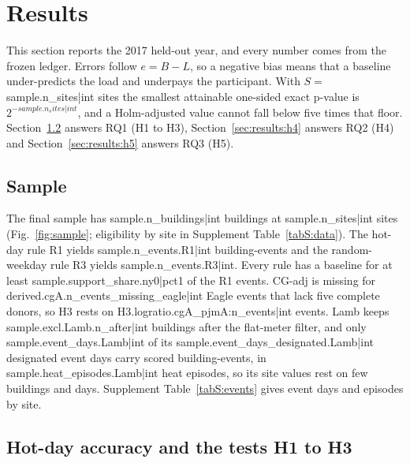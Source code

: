 \section{Results}\label{sec:results}

This section reports the 2017 held-out year, and every number comes from the frozen ledger. Errors follow $e=B-L$, so a negative bias means that a baseline under-predicts the load and underpays the participant. With $S=\,${{sample.n_sites|int}} sites the smallest attainable one-sided exact p-value is $2^{-{{sample.n_sites|int}}}$, and a Holm-adjusted value cannot fall below five times that floor. Section~\ref{sec:results:accuracy} answers RQ1 (H1 to H3), Section~\ref{sec:results:h4} answers RQ2 (H4) and Section~\ref{sec:results:h5} answers RQ3 (H5).

\subsection{Sample}\label{sec:results:sample}

The final sample has {{sample.n_buildings|int}} buildings at {{sample.n_sites|int}} sites (Fig.~\ref{fig:sample}; eligibility by site in Supplement Table~\ref{tabS:data}). The hot-day rule R1 yields {{sample.n_events.R1|int}} building-events and the random-weekday rule R3 yields {{sample.n_events.R3|int}}. Every rule has a baseline for at least {{sample.support_share.ny0|pct1}} of the R1 events. CG-adj is missing for {{derived.cgA.n_events_missing_eagle|int}} Eagle events that lack five complete donors, so H3 rests on {{H3.logratio.cgA_pjmA:n_events|int}} events. Lamb keeps {{sample.excl.Lamb.n_after|int}} buildings after the flat-meter filter, and only {{sample.event_days.Lamb|int}} of its {{sample.event_days_designated.Lamb|int}} designated event days carry scored building-events, in {{sample.heat_episodes.Lamb|int}} heat episodes, so its site values rest on few buildings and days. Supplement Table~\ref{tabS:events} gives event days and episodes by site.

\subsection{Hot-day accuracy and the tests H1 to H3}\label{sec:results:accuracy}

